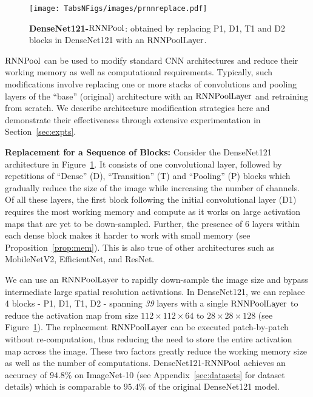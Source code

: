 \documentclass[10pt]{article}
\newcommand{\rpool}{\ensuremath{{\rm RNNPool}}\xspace}
\newcommand{\rpoollayer}{\ensuremath{{\rm RNNPoolLayer}}\xspace}
\newcommand{\alg}{\rpool}
\begin{document}
\begin{wrapfigure}{r}{0.48\columnwidth}
  \centering
  \vspace{-25pt}
    \texttt{[image: TabsNFigs/images/prnnreplace.pdf]}
\caption{\small \textbf{DenseNet121-\alg}: obtained by replacing P1,
  D1, T1 and D2 blocks in DenseNet121 with an \rpoollayer.}
\label{fig:DenseNet-PRNN}
\vspace{-12pt}
\end{wrapfigure}
 
\rpool can be used to modify standard CNN architectures and reduce
their working memory as well as computational requirements. Typically,
such modifications involve replacing one or more stacks of
convolutions and pooling layers of the ``base'' (original)
architecture with an \rpoollayer and retraining from scratch. We
describe architecture modification strategies here and demonstrate
their effectiveness through extensive experimentation in
Section~\ref{sec:expts}.

\textbf{Replacement for a Sequence of Blocks:} Consider the
DenseNet121~\citep{huang2017densely} architecture in
Figure~\ref{fig:DenseNet-PRNN}.  It consists of one convolutional
layer, followed by repetitions of ``Dense'' (D), ``Transition'' (T)
and ``Pooling'' (P) blocks which gradually reduce the size of the
image while increasing the number of channels.  Of all these layers,
the first block following the initial convolutional layer (D1)
requires the most working memory and compute as it works on large
activation maps that are yet to be down-sampled.  Further, the
presence of 6 layers within each dense block makes it harder to work
with small memory (see Proposition~\ref{prop:mem}).  This is also true
of other architectures such as MobileNetV2, EfficientNet, and ResNet.

We can use an \rpoollayer to rapidly down-sample the image size and
bypass intermediate large spatial resolution activations. In
DenseNet121, we can replace 4 blocks - P1, D1, T1, D2 - spanning
\emph{39} layers with a single \rpoollayer to reduce the activation
map from size $112\times 112\times64$ to $28\times28\times128$ (see
Figure~\ref{fig:DenseNet-PRNN}). The replacement \rpoollayer can be
executed patch-by-patch without re-computation, thus reducing the need
to store the entire activation map across the image.  These two
factors greatly reduce the working memory size as well as the number
of computations. DenseNet121-\rpool achieves an accuracy of $94.8\% $
on ImageNet-10 (see Appendix~\ref{sec:datasets} for dataset details)
which is comparable to $95.4\%$ of the original DenseNet121 model.
\end{document}
